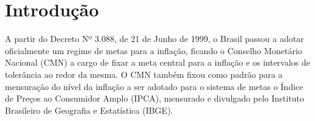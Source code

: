\documentclass[
	article,			%
	11pt,				%
	oneside,			%
	a4paper,			%
	english,			%
	brazil,				%
	]{abntex2}
\begin{document}
\pagebreak
\begin{KeepFromToc}
  \tableofcontents
\end{KeepFromToc}
\pagebreak

\begin{KeepFromToc}
  \def\@tocrmarg{2.55em plus 3em}
	\listoftables
\end{KeepFromToc}
\pagebreak

\begin{KeepFromToc}
  \listoffigures
\end{KeepFromToc}
\pagebreak

 
 


\textual

\section{Introdução}

	A partir do Decreto Nº 3.088, de 21 de Junho de 1999, o Brasil passou a adotar oficialmente um regime de metas para a inflação, ficando o Conselho Monetário Nacional (CMN) a cargo de fixar a meta central para a inflação e os intervalos de tolerância ao redor da mesma. O CMN também fixou como padrão para a mensuração do nível da inflação a ser adotado para o sistema de metas o Índice de Preços ao Consumidor Amplo (IPCA), mensurado e divulgado pelo Instituto Brasileiro de Geografia e Estatística (IBGE).
	
\end{document}

